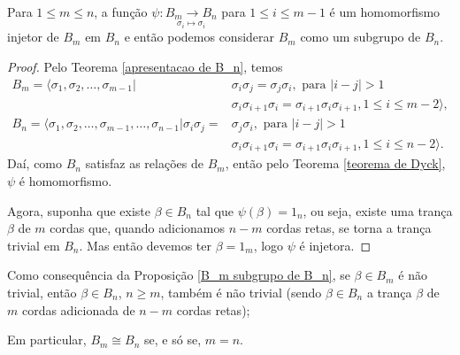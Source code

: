 	\begin{prop}
		\label{B_m subgrupo de B_n}
		Para $1\leq m\leq n$, a função $\psi: \underset{\sigma_i\mapsto\sigma_i}{B_m\to B_n}$ 
		para $1\leq i\leq m-1$ é um homomorfismo injetor de $B_m$ em $B_n$ e então podemos 
		considerar $B_m$ como um subgrupo de $B_n$. 
	\end{prop}
	\begin{proof}
		Pelo Teorema \ref{apresentacao de B_n}, temos
		\begin{align*}
		B_m = \langle \sigma_1, \sigma_2, \dots, \sigma_{m-1} | &\sigma_i\sigma_j = \sigma_j\sigma_i, 
		\text{ para }|i-j|>1 \\ 
		&\sigma_i\sigma_{i+1}\sigma_i = \sigma_{i+1}\sigma_i\sigma_{i+1}, 1\leq i\leq m-2\rangle, \\
		B_n = \langle \sigma_1, \sigma_2, \dots, \sigma_{m-1}, \dots, \sigma_{n-1} | \sigma_i\sigma_j 
		= &\sigma_j\sigma_i, \text{ para }|i-j|>1 \\ 
		&\sigma_i\sigma_{i+1}\sigma_i = \sigma_{i+1}\sigma_i\sigma_{i+1}, 1\leq i\leq n-2\rangle.
		\end{align*} 
		Daí, como $B_n$ satisfaz as relações de $B_m$, então pelo Teorema \ref{teorema de Dyck}, 
		$\psi$ é homomorfismo.
		
		\par\vspace{0.3cm} Agora, suponha que existe $\beta\in B_n$ tal que $\psi(\beta) = 1_n$, 
		ou seja, existe uma trança $\beta$ de $m$ cordas que, quando adicionamos $n-m$ cordas retas, 
		se torna a trança trivial em $B_n$. Mas então devemos ter $\beta = 1_m$, logo $\psi$ é injetora.
	\end{proof}
	\begin{remark}
		Como consequência da Proposição \ref{B_m subgrupo de B_n}, se $\beta\in B_m$ é 
		não trivial, então $\beta\in B_n$, $n\geq m$, também é não trivial (sendo $\beta\in B_n$ 
		a trança $\beta$ de $m$ cordas adicionada de $n-m$ cordas retas);
	\end{remark}
	\begin{remark}
	    Em particular, $B_m\cong B_n$ se, e só se, $m=n$.
	\end{remark}
